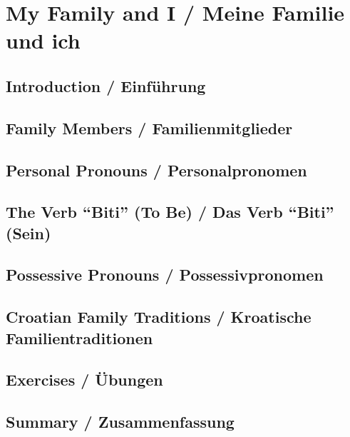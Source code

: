\chapter{My Family and I / Meine Familie und ich}

\section{Introduction / Einführung}

\section{Family Members / Familienmitglieder}

\section{Personal Pronouns / Personalpronomen}

\section{The Verb ``Biti'' (To Be) / Das Verb ``Biti'' (Sein)}

\section{Possessive Pronouns / Possessivpronomen}

\section{Croatian Family Traditions / Kroatische Familientraditionen}

\section{Exercises / Übungen}

\section{Summary / Zusammenfassung}
